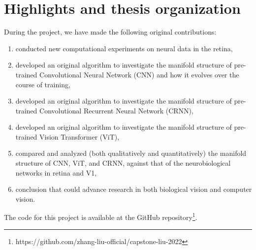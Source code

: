 




\section{Highlights and thesis organization}

During the project, we have made the following original contributions:
\begin{enumerate}[noitemsep, topsep=0pt]
    \item conducted new computational experiments on neural data in the retina,
    \item developed an original algorithm to investigate the manifold structure of pre-trained Convolutional Neural Network (CNN) and how it evolves over the course of training,
    \item developed an original algorithm to investigate the manifold structure of pre-trained Convolutional Recurrent Neural Network (CRNN),
    \item developed an original algorithm to investigate the manifold structure of pre-trained Vision Transformer (ViT),
    \item compared and analyzed (both qualitatively and quantitatively) the manifold structure of CNN, ViT, and CRNN, against that of the neurobiological networks in retina and V1,
    \item conclusion that could advance research in both biological vision and computer vision.
\end{enumerate}

The code for this project is available at the GitHub repository\footnote{https://github.com/zhang-liu-official/capstone-liu-2022}.


